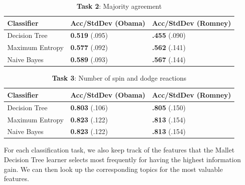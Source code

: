 \begin{table}[H]
\begin{centering}
\begin{tabular}{ l | l | l }
Classifier & Acc/StdDev (Obama) & Acc/StdDev (Romney) \\
\hline
Decision Tree & \textbf{0.519} (.095) &  \textbf{.455} (.090) \\
Maximum Entropy & \textbf{0.577} (.092) &  \textbf{.562} (.141) \\
Naive Bayes & \textbf{0.589} (.093) &  \textbf{.567} (.144) \\
\end{tabular}
\caption{\textbf{Task 2}: Majority agreement}
\end{centering}
\end{table}

\begin{table}[H]
\begin{centering}
\begin{tabular}{ l | l | l }
Classifier & Acc/StdDev (Obama) & Acc/StdDev (Romney) \\
\hline
Decision Tree & \textbf{0.803} (.106) &  \textbf{.805} (.150) \\
Maximum Entropy & \textbf{0.823} (.122) &  \textbf{.813} (.154) \\
Naive Bayes & \textbf{0.823} (.122) &  \textbf{.813} (.154) \\
\end{tabular}
\caption{\textbf{Task 3}: Number of spin and dodge reactions}
\label{tab:task3boydstun}
\end{centering}
\end{table}

For each classification task, we also keep track of the features that the Mallet Decision Tree learner selects most frequently for having the highest information gain. We can then look up the corresponding topics for the most valuable features.

